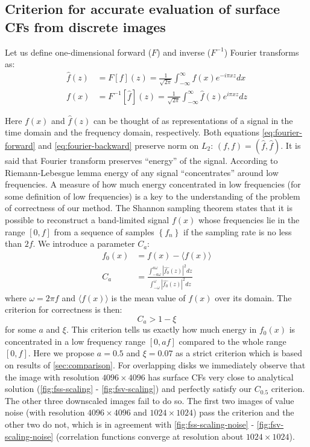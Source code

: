 \documentclass[reprint,amsmath,amssymb,aps,pre,showkeys,showpacs]{revtex4-1}
\begin{document}
\subsection{Criterion for accurate evaluation of surface CFs from discrete images}
\label{sec:crit}
Let us define one-dimensional forward ($F$) and inverse ($F^{-1}$) Fourier
transforms as:
\begin{align}
  \hat{f}(z) &= F[f](z) = \frac{1}{\sqrt{2\pi}}\int_{-\infty}^{\infty} f(x)
  e^{-i\pi xz} dx \label{eq:fourier-forward} \\
  f(x) &= F^{-1}[\hat{f}](z) = \frac{1}{\sqrt{2\pi}}\int_{-\infty}^{\infty} \hat{f}(z)
  e^{i\pi xz} dz \label{eq:fourier-backward}
\end{align}

Here $f(x)$ and $\hat{f}(z)$ can be thought of as representations of a signal in
the time domain and the frequency domain, respectively. Both equations
\cref{eq:fourier-forward} and \cref{eq:fourier-backward} preserve norm on $L_2$:
$(f, f) = (\hat{f}, \hat{f})$. It is said that Fourier transform preserves
``energy'' of the signal. According to Riemann-Lebesgue lemma \cite{HilbertSpaces}
energy of any signal ``concentrates'' around low frequencies. A measure of how
much energy concentrated in low frequencies (for some definition of low
frequencies) is a key to the understanding of the problem of correctness of our
method. The Shannon sampling theorem \cite{HilbertSpaces} states that it is
possible to reconstruct a band-limited signal $f(x)$ whose frequencies lie in
the range $[0, f]$ from a sequence of samples $\left\{f_n\right\}$ if the
sampling rate is no less than $2f$. We introduce a parameter $C_a$:
\begin{align*}
  f_0(x) &= f(x) - \langle f(x) \rangle \\
  C_a &= \frac{\int_{-a\omega}^{a\omega} |\hat{f_0}(z)|^2
    dz}{\int_{-\omega}^{\omega} |\hat{f_0}(z)|^2 dz}
\end{align*}
where $\omega = 2\pi f$ and $\langle f(x) \rangle$ is the mean value of $f(x)$
over its domain. The criterion for correctness is then:
\begin{equation*}
  C_a > 1 - \xi
\end{equation*}
for some $a$ and $\xi$. This criterion tells us exactly how much energy in
$f_0(x)$ is concentrated in a low frequency range $[0, af]$ compared to the
whole range $[0, f]$. Here we propose $a = 0.5$ and $\xi = 0.07$ as
a strict criterion which is based on results of
\cref{sec:comparison}. For overlapping disks we immediately observe that the
image with resolution $4096 \times 4096$ has surface CFs very close to
analytical solution (\cref{fig:fss-scaling} - \cref{fig:fsv-scaling}) and
perfectly satisfy our $C_{0.5}$ criterion. The other three downscaled images
fail to do so. The first two images of value noise (with
resolution $4096 \times 4096$ and $1024 \times 1024$) pass the criterion and the
other two do not, which is in agreement with \cref{fig:fss-scaling-noise} -
\cref{fig:fsv-scaling-noise} (correlation functions converge at resolution about
$1024 \times 1024$).
\end{document}
